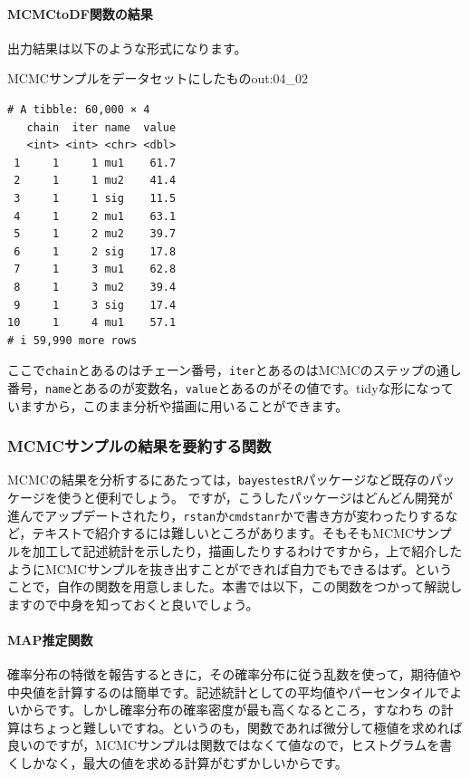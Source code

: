 \documentclass{ltjsbook}
\begin{document}
\paragraph{MCMCtoDF関数の結果}
出力結果は以下のような形式になります。
\begin{Rscreen}{MCMCサンプルをデータセットにしたもの}{out:04_02}
	\begin{verbatim}
# A tibble: 60,000 × 4
   chain  iter name  value
   <int> <int> <chr> <dbl>
 1     1     1 mu1    61.7
 2     1     1 mu2    41.4
 3     1     1 sig    11.5
 4     1     2 mu1    63.1
 5     1     2 mu2    39.7
 6     1     2 sig    17.8
 7     1     3 mu1    62.8
 8     1     3 mu2    39.4
 9     1     3 sig    17.4
10     1     4 mu1    57.1
# i 59,990 more rows
  \end{verbatim}
\end{Rscreen}
ここで\verb|chain|とあるのはチェーン番号，\verb|iter|とあるのはMCMCのステップの通し番号，\verb|name|とあるのが変数名，\verb|value|とあるのがその値です。tidyな形になっていますから，このまま分析や描画に用いることができます。

\subsubsection{MCMCサンプルの結果を要約する関数}
MCMCの結果を分析するにあたっては，\verb|bayestestR|パッケージなど既存のパッケージを使うと便利でしょう。
ですが，こうしたパッケージはどんどん開発が進んでアップデートされたり，\verb|rstan|か\verb|cmdstanr|かで書き方が変わったりするなど，テキストで紹介するには難しいところがあります。そもそもMCMCサンプルを加工して記述統計を示したり，描画したりするわけですから，上で紹介したようにMCMCサンプルを抜き出すことができれば自力でもできるはず。ということで，自作の関数を用意しました。本書では以下，この関数をつかって解説しますので中身を知っておくと良いでしょう。

\paragraph{MAP推定関数}
確率分布の特徴を報告するときに，その確率分布に従う乱数を使って，期待値や中央値を計算するのは簡単です。記述統計としての平均値やパーセンタイルでよいからです。しかし確率分布の確率密度が最も高くなるところ，すなわち の計算はちょっと難しいですね。というのも，関数であれば微分して極値を求めれば良いのですが，MCMCサンプルは関数ではなくて値なので，ヒストグラムを書くしかなく，最大の値を求める計算がむずかしいからです。
\end{document}
